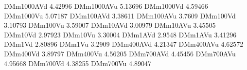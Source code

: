 DMm1000AVd 4.42996
DMm1000AVu 5.13696
DMm1000Vd 4.59466
DMm1000Vu 5.07187
DMm100AVd 3.38611
DMm100AVu 3.7609
DMm100Vd 3.10793
DMm100Vu 3.59007
DMm10AVd 3.00979
DMm10AVu 3.45505
DMm10Vd 2.97923
DMm10Vu 3.30004
DMm1AVd 2.9548
DMm1AVu 3.41296
DMm1Vd 2.80896
DMm1Vu 3.2909
DMm400AVd 4.21347
DMm400AVu 4.62572
DMm400Vd 3.89797
DMm400Vu 4.56205
DMm700AVd 4.45456
DMm700AVu 4.95668
DMm700Vd 4.38255
DMm700Vu 4.89047
